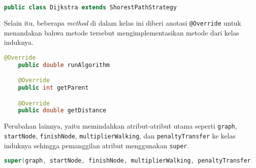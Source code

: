 \begin{lstlisting}[language=Java, caption=Dijkstra.java, basicstyle=\small\ttfamily]
    public class Dijkstra extends ShorestPathStrategy
\end{lstlisting}
\noindent
Selain itu, beberapa \textit{method} di dalam kelas ini diberi anotasi \texttt{@Override} untuk menandakan bahwa metode tersebut mengimplementasikan metode dari kelas induknya.
\begin{lstlisting}[language=Java, caption=Dijkstra.java, basicstyle=\small\ttfamily]
    @Override
    public double runAlgorithm

    @Override
    public int getParent

    @Override
    public double getDistance
\end{lstlisting}

\noindent
Perubahan lainnya, yaitu memindahkan atribut-atribut utama seperti \texttt{graph}, \texttt{startNode}, \texttt{finishNode}, \texttt{multiplierWalking}, dan \texttt{penaltyTransfer} ke kelas induknya sehingga pemanggilan atribut menggunakan \texttt{super}.

\begin{lstlisting}[language=Java, caption=Dijkstra.java, basicstyle=\small\ttfamily]
 super(graph, startNode, finishNode, multiplierWalking, penaltyTransfer);
\end{lstlisting}

